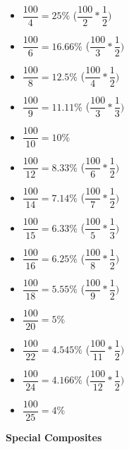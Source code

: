 \begin{multicols}{3}
\begin{itemize}
    \item $\dfrac{100}{4} = 25\%$ \hspace{0.2cm}($\dfrac{100}{2} * \dfrac{1}{2})$
    \item $\dfrac{100}{6} = 16.66\%$ \hspace{0.2cm}($\dfrac{100}{3} * \dfrac{1}{2})$
    \item $\dfrac{100}{8} = 12.5\%$ \hspace{0.2cm}($\dfrac{100}{4} * \dfrac{1}{2})$
    \item $\dfrac{100}{9} = 11.11\%$ \hspace{0.2cm} ($\dfrac{100}{3} * \dfrac{1}{3})$
    \item $\dfrac{100}{10} = 10\%$ 
    \item $\dfrac{100}{12} = 8.33\%$ \hspace{0.2cm} ($\dfrac{100}{6} * \dfrac{1}{2})$
    \item $\dfrac{100}{14} = 7.14\%$ \hspace{0.2cm} ($\dfrac{100}{7} * \dfrac{1}{2})$
    \item $\dfrac{100}{15} = 6.33\%$ \hspace{0.2cm} ($\dfrac{100}{5} * \dfrac{1}{3})$
    \item $\dfrac{100}{16} = 6.25\%$ \hspace{0.2cm} ($\dfrac{100}{8} * \dfrac{1}{2})$
    \item $\dfrac{100}{18} = 5.55\%$ \hspace{0.2cm} ($\dfrac{100}{9} * \dfrac{1}{2})$
    \item $\dfrac{100}{20} = 5\%$ 
    \item $\dfrac{100}{22} = 4.545\%$ \hspace{0.2cm} ($\dfrac{100}{11} * \dfrac{1}{2})$
    \item $\dfrac{100}{24} = 4.166\%$ \hspace{0.2cm} ($\dfrac{100}{12} * \dfrac{1}{2})$
    \item $\dfrac{100}{25} = 4\%$
\end{itemize}

\columnbreak

\textbf{Special Composites}


\end{multicols}
